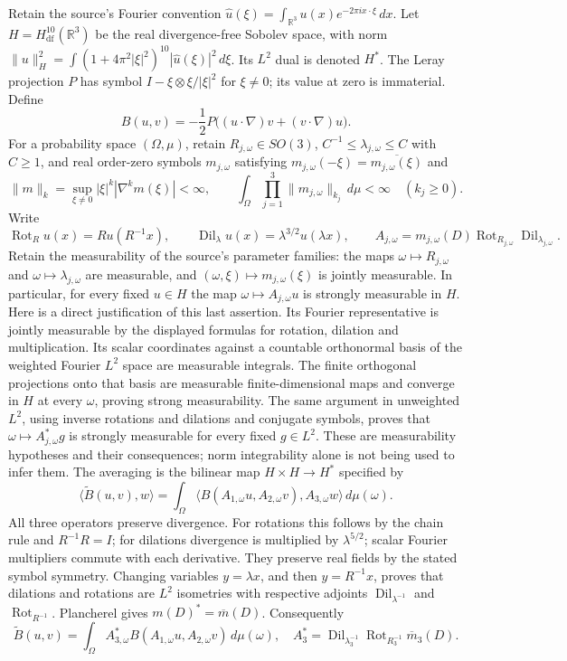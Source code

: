 Retain the source's Fourier convention
$\widehat u(\xi)=\int_{\mathbb R^3}u(x)e^{-2\pi i x\cdot\xi}\,dx$.
Let $H=H^{10}_{\mathrm{df}}(\mathbb R^3)$ be the real divergence-free Sobolev
space, with norm
$\|u\|_H^2=\int(1+4\pi^2|\xi|^2)^{10}|\widehat u(\xi)|^2\,d\xi$.
Its $L^2$ dual is denoted $H^*$.
The Leray projection $P$ has symbol
$I-\xi\otimes\xi/|\xi|^2$ for $\xi\ne0$; its value at zero is immaterial.
Define
\[
 B(u,v)=-\frac12 P\big((u\cdot\nabla)v+(v\cdot\nabla)u\big).
\]
For a probability space $(\Omega,\mu)$, retain
$R_{j,\omega}\in SO(3)$, $C^{-1}\leq\lambda_{j,\omega}\leq C$ with $C\geq1$,
and real order-zero symbols $m_{j,\omega}$ satisfying
$m_{j,\omega}(-\xi)=\overline{m_{j,\omega}(\xi)}$ and
\[
 \|m\|_k=\sup_{\xi\ne0}|\xi|^k|\nabla^k m(\xi)|<\infty,
 \qquad \int_\Omega\prod_{j=1}^3\|m_{j,\omega}\|_{k_j}\,d\mu<\infty
 \quad(k_j\geq0).
\]
Write
\[
 \operatorname{Rot}_R u(x)=Ru(R^{-1}x),\qquad
 \operatorname{Dil}_\lambda u(x)=\lambda^{3/2}u(\lambda x),\qquad
 A_{j,\omega}=m_{j,\omega}(D)\operatorname{Rot}_{R_{j,\omega}}
                       \operatorname{Dil}_{\lambda_{j,\omega}}.
\]
Retain the measurability of the source's parameter families: the maps
$\omega\mapsto R_{j,\omega}$ and $\omega\mapsto\lambda_{j,\omega}$
are measurable, and $(\omega,\xi)\mapsto m_{j,\omega}(\xi)$ is jointly
measurable. In particular, for every fixed $u\in H$ the map
$\omega\mapsto A_{j,\omega}u$ is strongly measurable in $H$.
Here is a direct justification of this last assertion. Its Fourier
representative is jointly measurable by the displayed formulas for
rotation, dilation and multiplication. Its scalar coordinates against a
countable orthonormal basis of the weighted Fourier $L^2$ space are
measurable integrals. The finite orthogonal projections onto that basis
are measurable finite-dimensional maps and converge in $H$ at every
$\omega$, proving strong measurability. The same argument in unweighted
$L^2$, using inverse rotations and dilations and conjugate symbols,
proves that $\omega\mapsto A_{j,\omega}^*g$ is strongly measurable
for every fixed $g\in L^2$. These are measurability hypotheses and their
consequences; norm integrability alone is not being used to infer them.
The averaging is the bilinear map $H\times H\to H^*$ specified by
\[
 \langle\widetilde B(u,v),w\rangle
 =\int_\Omega\langle B(A_{1,\omega}u,A_{2,\omega}v),A_{3,\omega}w\rangle
 \,d\mu(\omega).                                      \tag{WA1}
\]
All three operators preserve divergence. For rotations this follows by the
chain rule and $R^{-1}R=I$; for dilations divergence is multiplied by
$\lambda^{5/2}$; scalar Fourier multipliers commute with each derivative.
They preserve real fields by the stated symbol symmetry. Changing variables
$y=\lambda x$, and then $y=R^{-1}x$, proves that dilations and rotations are
$L^2$ isometries with respective adjoints $\operatorname{Dil}_{\lambda^{-1}}$
and $\operatorname{Rot}_{R^{-1}}$. Plancherel gives
$m(D)^*=\overline m(D)$. Consequently
\[
 \widetilde B(u,v)=\int_\Omega A_{3,\omega}^*
                  B(A_{1,\omega}u,A_{2,\omega}v)\,d\mu(\omega),
 \quad
 A_3^*=\operatorname{Dil}_{\lambda_3^{-1}}
       \operatorname{Rot}_{R_3^{-1}}\overline m_3(D).       \tag{WA2}
\]

